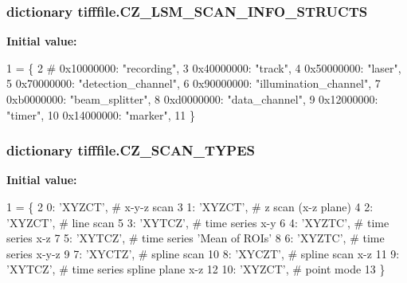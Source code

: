 \hypertarget{namespacetifffile_a308da713564f561debbd4e6d07500659}{
\subsubsection[{C\-Z\-\_\-\-L\-S\-M\-\_\-\-S\-C\-A\-N\-\_\-\-I\-N\-F\-O\-\_\-\-S\-T\-R\-U\-C\-T\-S}]{\setlength{\rightskip}{0pt plus 5cm}dictionary tifffile.\-C\-Z\-\_\-\-L\-S\-M\-\_\-\-S\-C\-A\-N\-\_\-\-I\-N\-F\-O\-\_\-\-S\-T\-R\-U\-C\-T\-S}}\label{namespacetifffile_a308da713564f561debbd4e6d07500659}
{\bfseries Initial value\-:}
\begin{DoxyCode}
1 = \{
2     \textcolor{comment}{# 0x10000000: "recording",}
3     0x40000000: \textcolor{stringliteral}{"track"},
4     0x50000000: \textcolor{stringliteral}{"laser"},
5     0x70000000: \textcolor{stringliteral}{"detection\_channel"},
6     0x90000000: \textcolor{stringliteral}{"illumination\_channel"},
7     0xb0000000: \textcolor{stringliteral}{"beam\_splitter"},
8     0xd0000000: \textcolor{stringliteral}{"data\_channel"},
9     0x12000000: \textcolor{stringliteral}{"timer"},
10     0x14000000: \textcolor{stringliteral}{"marker"},
11 \}
\end{DoxyCode}
\hypertarget{namespacetifffile_a729eeb5a29d1da4cf54f5ddf50e4a01e}{
\subsubsection[{C\-Z\-\_\-\-S\-C\-A\-N\-\_\-\-T\-Y\-P\-E\-S}]{\setlength{\rightskip}{0pt plus 5cm}dictionary tifffile.\-C\-Z\-\_\-\-S\-C\-A\-N\-\_\-\-T\-Y\-P\-E\-S}}\label{namespacetifffile_a729eeb5a29d1da4cf54f5ddf50e4a01e}
{\bfseries Initial value\-:}
\begin{DoxyCode}
1 = \{
2     0: \textcolor{stringliteral}{'XYZCT'},  \textcolor{comment}{# x-y-z scan}
3     1: \textcolor{stringliteral}{'XYZCT'},  \textcolor{comment}{# z scan (x-z plane)}
4     2: \textcolor{stringliteral}{'XYZCT'},  \textcolor{comment}{# line scan}
5     3: \textcolor{stringliteral}{'XYTCZ'},  \textcolor{comment}{# time series x-y}
6     4: \textcolor{stringliteral}{'XYZTC'},  \textcolor{comment}{# time series x-z}
7     5: \textcolor{stringliteral}{'XYTCZ'},  \textcolor{comment}{# time series 'Mean of ROIs'}
8     6: \textcolor{stringliteral}{'XYZTC'},  \textcolor{comment}{# time series x-y-z}
9     7: \textcolor{stringliteral}{'XYCTZ'},  \textcolor{comment}{# spline scan}
10     8: \textcolor{stringliteral}{'XYCZT'},  \textcolor{comment}{# spline scan x-z}
11     9: \textcolor{stringliteral}{'XYTCZ'},  \textcolor{comment}{# time series spline plane x-z}
12     10: \textcolor{stringliteral}{'XYZCT'},  \textcolor{comment}{# point mode}
13 \}
\end{DoxyCode}

